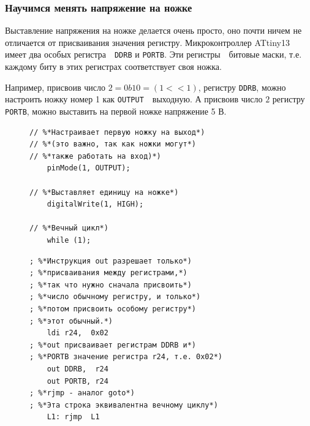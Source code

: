 \documentclass[aspectratio=169, pdf, 8pt, unicode]{beamer}
\begin{document}
\begin{frame}[fragile]
\frametitle{Научимся менять напряжение на ножке}
	{
		Выставление напряжения на ножке делается очень просто, оно почти ничем не отличается от присваивания значения
		регистру. Микроконтроллер ATtiny13 имеет два особых регистра\ \cyrdash\ \texttt{DDRB} и \texttt{PORTB}.
		Эти регистры\ \cyrdash\ битовые маски, т.е. каждому биту в этих регистрах соответствует своя ножка.

		Например, присвоив число $2 = 0b10 = (1 << 1)$, регистру
		\texttt{DDRB}, можно настроить ножку номер 1 как \texttt{OUTPUT}\ \cyrdash\ выходную. А присвоив число $2$
		регистру \texttt{PORTB}, можно выставить на первой ножке напряжение 5 В.
	}
	\begin{figure}[!htb]
		\centering
		\begin{minipage}{.45\textwidth}
			\centering
			\begin{lstlisting}
// %*Настраивает первую ножку на выход*)
// %*(это важно, так как ножки могут*)
// %*также работать на вход)*)
    pinMode(1, OUTPUT);

// %*Выставляет единицу на ножке*)
    digitalWrite(1, HIGH);

// %*Вечный цикл*)
    while (1);
			\end{lstlisting}
		\end{minipage}
		\begin{minipage}{.45\textwidth}
			\centering
			\begin{lstlisting}
; %*Инструкция out разрешает только*)
; %*присваивания между регистрами,*)
; %*так что нужно сначала присвоить*)
; %*число обычному регистру, и только*)
; %*потом присвоить особому регистру*)
; %*этот обычный.*)
    ldi r24,  0x02
; %*out присваивает регистрам DDRB и*)
; %*PORTB значение регистра r24, т.е. 0x02*)
    out DDRB,  r24
    out PORTB, r24
; %*rjmp - аналог goto*)
; %*Эта строка эквивалентна вечному циклу*)
    L1: rjmp  L1
			\end{lstlisting}
		\end{minipage}
	\end{figure}
\end{frame}
\end{document}
